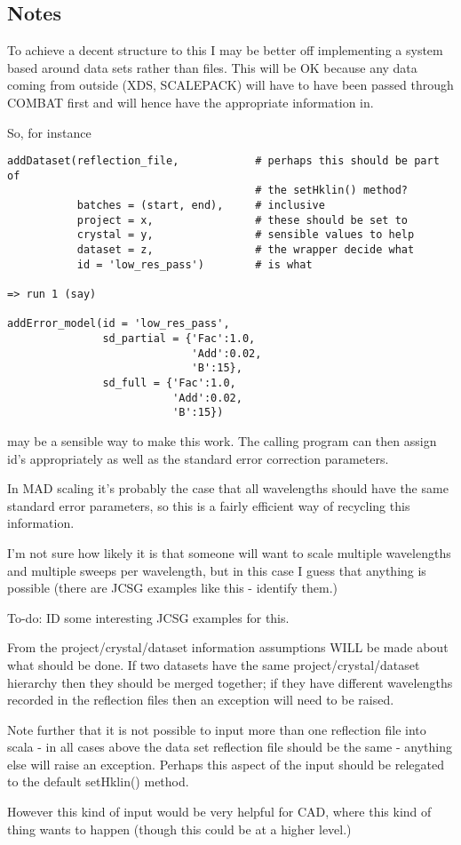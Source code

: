 \documentclass[a4paper, 11pt]{article}
\begin{document}
\subsection{Notes}

To achieve a decent structure to this I may be better off implementing a 
system based around data sets rather than files. This will be OK because 
any data coming from outside (XDS, SCALEPACK) will have to have been passed
through COMBAT first and will hence have the appropriate information in.

So, for instance

{
\tiny
\begin{verbatim}
addDataset(reflection_file,            # perhaps this should be part of
                                       # the setHklin() method?
           batches = (start, end),     # inclusive
           project = x,                # these should be set to
           crystal = y,                # sensible values to help
           dataset = z,                # the wrapper decide what
           id = 'low_res_pass')        # is what

=> run 1 (say)

addError_model(id = 'low_res_pass',
               sd_partial = {'Fac':1.0,
                             'Add':0.02,
                             'B':15},
               sd_full = {'Fac':1.0,
                          'Add':0.02,
                          'B':15})
\end{verbatim}
}
\noindent
may be a sensible way to make this work. The calling program can then assign
id's appropriately as well as the standard error correction parameters.

In MAD scaling it's probably the case that all wavelengths should have the 
same standard error parameters, so this is a fairly efficient way of 
recycling this information.

I'm not sure how likely it is that someone will want to scale multiple
wavelengths and multiple sweeps per wavelength, but in this case I guess
that anything is possible (there are JCSG examples like this - identify 
them.)

To-do: ID some interesting JCSG examples for this.

From the project/crystal/dataset information assumptions WILL be made about
what should be done. If two datasets have the same project/crystal/dataset
hierarchy then they should be merged together; if they have different 
wavelengths recorded in the reflection files then an exception will need
to be raised.

Note further that it is not possible to input more than one reflection
file into scala - in all cases above the data set reflection file
should be the same - anything else will raise an exception. Perhaps this 
aspect of the input should be relegated to the default setHklin() method.

However this kind of input would be very helpful for CAD, where this kind
of thing wants to happen (though this could be at a higher level.)
\end{document}
